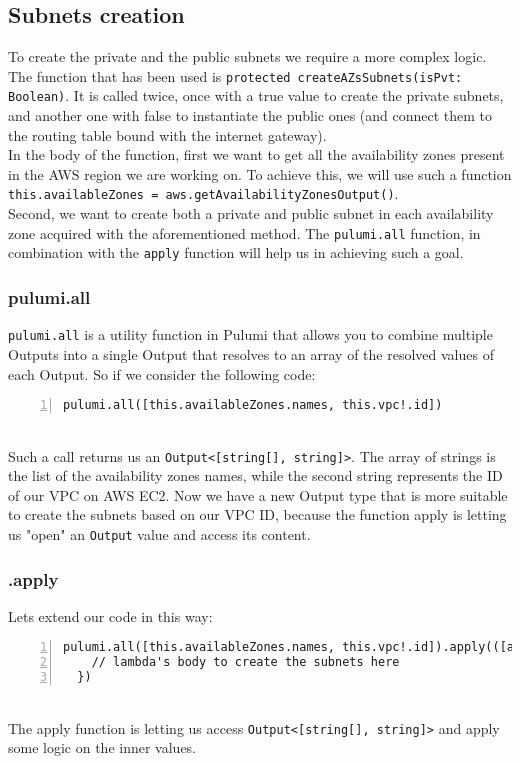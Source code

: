 \subsection{Subnets creation}
To create the private and the public subnets we require a more complex logic.
The function that has been used is \texttt{protected createAZsSubnets(isPvt: Boolean)}.
It is called twice, once with a true value to create the private subnets, and another one with false to instantiate the public ones (and connect them to the routing table bound with the internet gateway).\\
In the body of the function, first we want to get all the availability zones present in the AWS region we are working on.
To achieve this, we will use such a function \texttt{this.availableZones = aws.getAvailabilityZonesOutput()}.\\
Second, we want to create both a private and public subnet in each availability zone acquired with the aforementioned method.
The \texttt{pulumi.all} function, in combination with the \texttt{apply} function will help us in achieving such a goal.\\

\subsubsection{pulumi.all}
\label{sssec:pulumi-all}
\texttt{pulumi.all} is a utility function in Pulumi that allows you to combine multiple Outputs into a single Output that resolves to an array of the resolved values of each Output.
So if we consider the following code:
\begin{lstlisting}[numbers=left, numberstyle=\tiny, numbersep=-5pt, stepnumber=1]
  pulumi.all([this.availableZones.names, this.vpc!.id])
\end{lstlisting}\mbox{}\\
Such a call returns us an \texttt{Output<[string[], string]>}.
The array of strings is the list of the availability zones names, while the second string represents the ID of our VPC on AWS EC2.
Now we have a new Output type that is more suitable to create the subnets based on our VPC ID, because the function apply is letting us "open" an \texttt{Output} value and access its content.

\subsubsection{.apply}
Lets extend our code in this way:
\begin{lstlisting}[numbers=left, numberstyle=\tiny, numbersep=-5pt, stepnumber=1]
  pulumi.all([this.availableZones.names, this.vpc!.id]).apply(([azNames, vpcId]) => {
    // lambda's body to create the subnets here
  })
\end{lstlisting}\mbox{}\\
The apply function is letting us access \texttt{Output<[string[], string]>} and apply some logic on the inner values.\\

